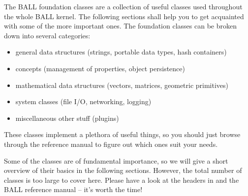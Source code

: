 \label{section:kernel-data-structures}

\noindent
The BALL foundation classes are a collection of useful classes used throughout
the whole BALL kernel. The following sections shall help you to get acquainted
with some of the more important ones. The foundation classes can be broken down
into several categories:
\begin{itemize}
  \item general data structures (\eg strings, portable data types, hash
	containers)
  \item concepts (\eg management of properties, object persistence)
  \item mathematical data structures (\eg vectors, matrices, geometric
        primitives)
  \item system classes (file I/O, networking, logging)
  \item miscellaneous other stuff (plugins)
\end{itemize}
These classes implement a plethora of useful things, so you should just browse
through the reference manual to figure out which ones suit your needs. 

Some of the classes are of fundamental importance, so we will give a short
overview of their basics in the following sections. However, the total number
of classes is too large to cover here. Please have a look at the headers in 
 and the
BALL reference manual -- it's worth the time!
